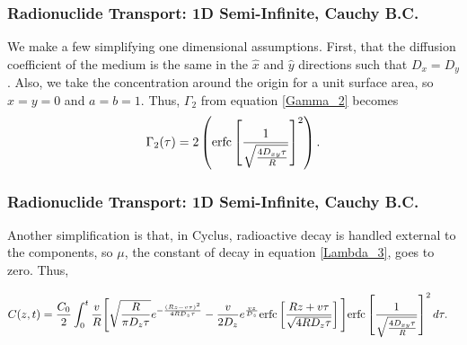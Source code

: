 \begin{frame}
\frametitle{Radionuclide Transport: 1D Semi-Infinite, Cauchy B.C.}
\footnotesize{
We make a few simplifying one dimensional assumptions. First, that the diffusion 
coefficient of the medium is the same in the $\hat{x}$ and $\hat{y}$ directions 
such that $D_x=D_y$. Also, we take the concentration around the origin for a 
unit surface area, so $x=y=0$ and $a=b=1$. Thus, $\Gamma_2$ from equation \eqref{Gamma_2} becomes
\begin{align}
  \Gamma_2(\tau) = 2\left(\mathrm{erfc}\left[{\frac{1}{\sqrt{\frac{4D_{xy}\tau}{R}}} 
}\right]^2\right).
\end{align}
}
\end{frame}

\begin{frame}
\frametitle{Radionuclide Transport: 1D Semi-Infinite, Cauchy B.C.}
\footnotesize{
Another simplification is that, in Cyclus, radioactive decay is handled external 
to the components, so $\mu$, the constant of decay in equation \eqref{Lambda_3}, 
goes to zero. Thus, 

\begin{align}
  C(z,t)&= \frac{C_0}{2}\int_0^t\frac{v}{R}
  \Bigg[\sqrt{\frac{R}{\pi D_z\tau}}e^{-\frac{(Rz-v\tau)^2}{4RD_z\tau}} -
    \frac{v}{2D_z}e^\frac{vz}{D_z}\mathrm{erfc}\left[{\frac{Rz+v\tau}{\sqrt{4RD_z\tau}}}\right]\Bigg]
    \mathrm{erfc}\left[{\frac{1}{\sqrt{\frac{4D_{xy}\tau}{R}}} }\right]^2
  d\tau .
  \label{simple_leij}
\end{align}
}
\end{frame}
